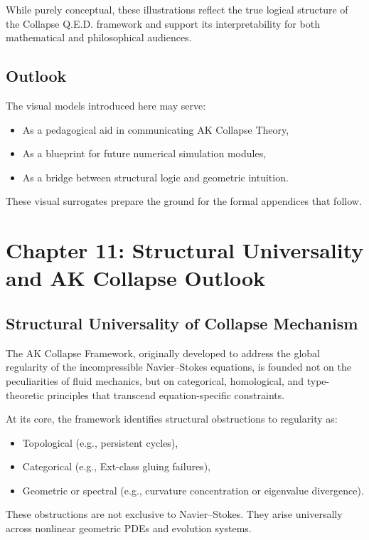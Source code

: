 \documentclass[11pt]{article}
\begin{document}
While purely conceptual, these illustrations reflect the true logical structure of the Collapse Q.E.D. framework and support its interpretability for both mathematical and philosophical audiences.

\subsection{Outlook}

The visual models introduced here may serve:
\begin{itemize}
  \item As a pedagogical aid in communicating AK Collapse Theory,
  \item As a blueprint for future numerical simulation modules,
  \item As a bridge between structural logic and geometric intuition.
\end{itemize}

These visual surrogates prepare the ground for the formal appendices that follow.



\section{Chapter 11: Structural Universality and AK Collapse Outlook}
\label{sec:universality-outlook}

\subsection{Structural Universality of Collapse Mechanism}

The AK Collapse Framework, originally developed to address the global regularity of the incompressible Navier–Stokes equations, is founded not on the peculiarities of fluid mechanics, but on categorical, homological, and type-theoretic principles that transcend equation-specific constraints.

At its core, the framework identifies structural obstructions to regularity as:
\begin{itemize}
  \item Topological (e.g., persistent cycles),
  \item Categorical (e.g., Ext-class gluing failures),
  \item Geometric or spectral (e.g., curvature concentration or eigenvalue divergence).
\end{itemize}

These obstructions are not exclusive to Navier–Stokes. They arise universally across nonlinear geometric PDEs and evolution systems.
\end{document}
